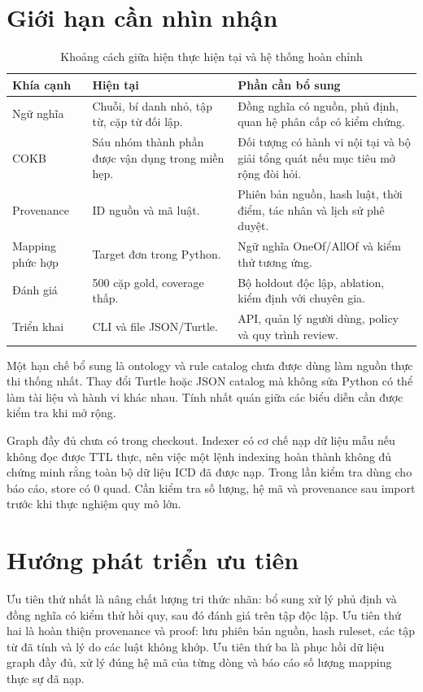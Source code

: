 \section{Giới hạn cần nhìn nhận}
\begin{table}[htbp]
\centering\small
\caption{Khoảng cách giữa hiện thực hiện tại và hệ thống hoàn chỉnh}\label{tab:gaps}
\begin{tabularx}{\textwidth}{p{3.0cm}YY}
\toprule
Khía cạnh & Hiện tại & Phần cần bổ sung\\
\midrule
Ngữ nghĩa & Chuỗi, bí danh nhỏ, tập từ, cặp từ đối lập. &
Đồng nghĩa có nguồn, phủ định, quan hệ phân cấp có kiểm chứng.\\
COKB & Sáu nhóm thành phần được vận dụng trong miền hẹp. &
Đối tượng có hành vi nội tại và bộ giải tổng quát nếu mục tiêu mở rộng đòi hỏi.\\
Provenance & ID nguồn và mã luật. &
Phiên bản nguồn, hash luật, thời điểm, tác nhân và lịch sử phê duyệt.\\
Mapping phức hợp & Target đơn trong Python. &
Ngữ nghĩa OneOf/AllOf và kiểm thử tương ứng.\\
Đánh giá & 500 cặp gold, coverage thấp. &
Bộ holdout độc lập, ablation, kiểm định với chuyên gia.\\
Triển khai & CLI và file JSON/Turtle. &
API, quản lý người dùng, policy và quy trình review.\\
\bottomrule
\end{tabularx}
\end{table}

Một hạn chế bổ sung là ontology và rule catalog chưa được dùng làm
nguồn thực thi thống nhất. Thay đổi Turtle hoặc JSON catalog mà không sửa
Python có thể làm tài liệu và hành vi khác nhau. Tính nhất quán giữa các
biểu diễn cần được kiểm tra khi mở rộng.

Graph đầy đủ chưa có trong checkout. Indexer có cơ chế nạp dữ liệu mẫu
nếu không đọc được TTL thực, nên việc một lệnh indexing hoàn thành
không đủ chứng minh rằng toàn bộ dữ liệu ICD đã được nạp.
Trong lần kiểm tra dùng cho báo cáo, store có 0 quad. Cần kiểm tra số lượng,
hệ mã và provenance sau import trước khi thực nghiệm quy mô lớn.

\section{Hướng phát triển ưu tiên}
Ưu tiên thứ nhất là nâng chất lượng tri thức nhãn: bổ sung xử lý phủ định
và đồng nghĩa có kiểm thử hồi quy, sau đó đánh giá trên tập độc lập.
Ưu tiên thứ hai là hoàn thiện provenance và proof: lưu phiên bản nguồn,
hash ruleset, các tập từ đã tính và lý do các luật không khớp.
Ưu tiên thứ ba là phục hồi dữ liệu graph đầy đủ, xử lý đúng hệ mã của từng
dòng và báo cáo số lượng mapping thực sự đã nạp.

